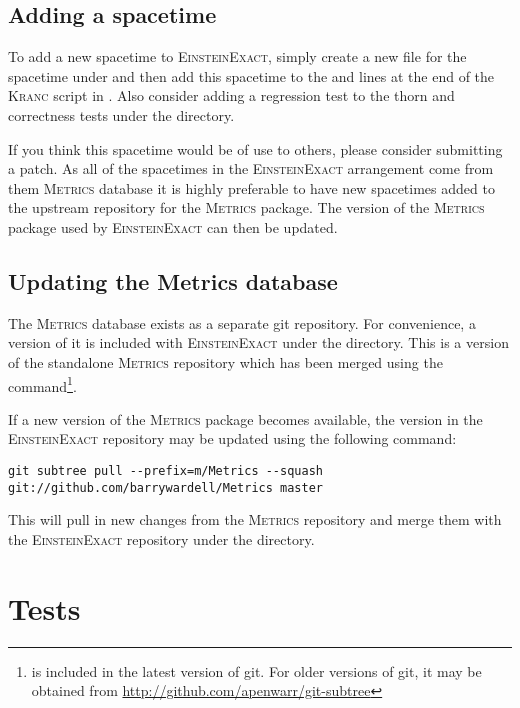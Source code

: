 \documentclass{article}
\begin{document}
\subsection{Adding a spacetime}
To add a new spacetime to \textsc{EinsteinExact}, simply create a new file
for the spacetime under  and then add this spacetime
to the  and  lines at the end
of the \textsc{Kranc} script in . Also consider adding
a regression test to the  thorn and correctness tests
under the  directory.

If you think this spacetime would be of use to others, please consider 
submitting a patch. As all of the spacetimes in the \textsc{EinsteinExact}
arrangement come from them \textsc{Metrics} database it is highly preferable to
have new spacetimes added to the upstream repository for the \textsc{Metrics}
package. The version of the \textsc{Metrics} package used by
\textsc{EinsteinExact} can then be updated.

\subsection{Updating the Metrics database}
The \textsc{Metrics} database exists as a separate git repository. For
convenience, a version of it is included with \textsc{EinsteinExact} under
the  directory. This is a version of the standalone
\textsc{Metrics} repository which has been merged using the 
command\footnote{ is included in the latest version of git.
For older versions of git, it may be obtained from
\url{http://github.com/apenwarr/git-subtree}}.

If a new version of the \textsc{Metrics} package becomes available, the version
in the \textsc{EinsteinExact} repository may be updated using the following
command:
\begin{verbatim}
git subtree pull --prefix=m/Metrics --squash git://github.com/barrywardell/Metrics master
\end{verbatim}
This will pull in new changes from the \textsc{Metrics} repository and merge
them with the \textsc{EinsteinExact} repository under the 
directory.

\section{Tests}
\end{document}
